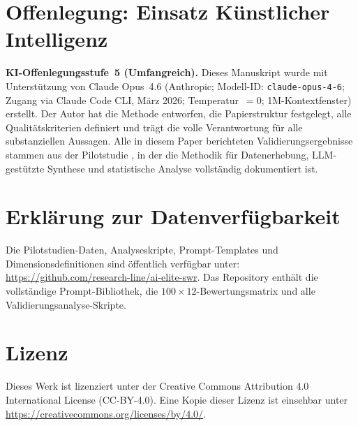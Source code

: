 \documentclass[11pt,a4paper]{article}
\begin{document}
\section*{Offenlegung: Einsatz K\"unstlicher Intelligenz}

\noindent\textbf{KI-Offenlegungsstufe~5 (Umfangreich).}
Dieses Manuskript wurde mit Unterst\"utzung von Claude Opus~4.6 (Anthropic; Modell-ID: \texttt{claude-opus-4-6}; Zugang via Claude Code CLI, M\"arz 2026; Temperatur~$= 0$; 1M-Kontextfenster) erstellt. Der Autor hat die Methode entworfen, die Papierstruktur festgelegt, alle Qualit\"atskriterien definiert und tr\"agt die volle Verantwortung f\"ur alle substanziellen Aussagen. Alle in diesem Paper berichteten Validierungsergebnisse stammen aus der Pilotstudie \citep{Geiger2026PaperA}, in der die Methodik f\"ur Datenerhebung, LLM-gest\"utzte Synthese und statistische Analyse vollst\"andig dokumentiert ist.


\section*{Erkl\"arung zur Datenverf\"ugbarkeit}

\noindent Die Pilotstudien-Daten, Analyseskripte, Prompt-Templates und Dimensionsdefinitionen sind \"offentlich verf\"ugbar unter: \url{https://github.com/research-line/ai-elite-swr}. Das Repository enth\"alt die vollst\"andige Prompt-Bibliothek, die $100 \times 12$-Bewertungsmatrix und alle Validierungsanalyse-Skripte.


\section*{Lizenz}

\noindent Dieses Werk ist lizenziert unter der Creative Commons Attribution 4.0 International License (CC-BY-4.0). Eine Kopie dieser Lizenz ist einsehbar unter \url{https://creativecommons.org/licenses/by/4.0/}.


\newpage
\end{document}
